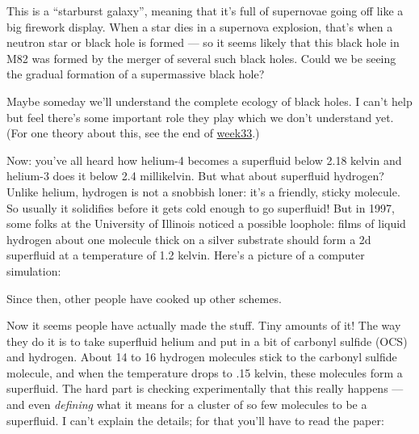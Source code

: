 \documentclass{article}
\def\tightlist{}
\renewcommand{\texttt}[1]{%
  \begingroup
  \ttfamily
  \begingroup\lccode`~=`/\lowercase{\endgroup\def~}{/\discretionary{}{}{}}%
  \begingroup\lccode`~=`[\lowercase{\endgroup\def~}{[\discretionary{}{}{}}%
  \begingroup\lccode`~=`.\lowercase{\endgroup\def~}{.\discretionary{}{}{}}%
  \catcode`/=\active\catcode`[=\active\catcode`.=\active
  \scantokens{#1\noexpand}%
  \endgroup
}
\begin{document}
This is a ``starburst galaxy'', meaning that it's full of supernovae
going off like a big firework display. When a star dies in a supernova
explosion, that's when a neutron star or black hole is formed --- so it
seems likely that this black hole in M82 was formed by the merger of
several such black holes. Could we be seeing the gradual formation of a
supermassive black hole?

Maybe someday we'll understand the complete ecology of black holes. I
can't help but feel there's some important role they play which we don't
understand yet. (For one theory about this, see the end of
\href{week33.html}{week33}.)

Now: you've all heard how helium-4 becomes a superfluid below 2.18
kelvin and helium-3 does it below 2.4 millikelvin. But what about
superfluid hydrogen? Unlike helium, hydrogen is not a snobbish loner:
it's a friendly, sticky molecule. So usually it solidifies before it
gets cold enough to go superfluid! But in 1997, some folks at the
University of Illinois noticed a possible loophole: films of liquid
hydrogen about one molecule thick on a silver substrate should form a 2d
superfluid at a temperature of 1.2 kelvin. Here's a picture of a
computer simulation:


Since then, other people have cooked up other schemes.

Now it seems people have actually made the stuff. Tiny amounts of it!
The way they do it is to take superfluid helium and put in a bit of
carbonyl sulfide (OCS) and hydrogen. About 14 to 16 hydrogen molecules
stick to the carbonyl sulfide molecule, and when the temperature drops
to .15 kelvin, these molecules form a superfluid. The hard part is
checking experimentally that this really happens --- and even
\emph{defining} what it means for a cluster of so few molecules to be a
superfluid. I can't explain the details; for that you'll have to read
the paper:

\end{document}

